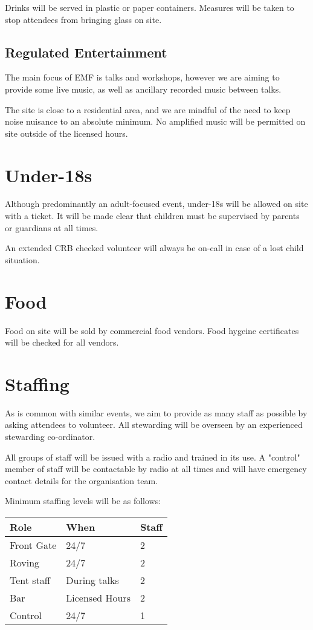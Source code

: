 Drinks will be served in plastic or paper containers. Measures will be taken to
stop attendees from bringing glass on site.

\subsection{Regulated Entertainment}

The main focus of EMF is talks and workshops, however we are aiming to provide some live music,
as well as ancillary recorded music between talks.

The site is close to a residential area, and we are mindful of the need to keep noise nuisance
to an absolute minimum. No amplified music will be permitted on site outside of the licensed hours.

\section{Under-18s}

Although predominantly an adult-focused event, under-18s will be allowed on site with a ticket. It will be
made clear that children must be supervised by parents or guardians at all times.

An extended CRB checked volunteer will always be on-call in case of a lost child situation.

\section{Food}

Food on site will be sold by commercial food vendors. Food hygeine certificates will be checked for all vendors.

\section{Staffing}

As is common with similar events, we aim to provide as many staff as possible
by asking attendees to volunteer. All stewarding will be overseen by an experienced stewarding co-ordinator.

All groups of staff will be issued with a radio and trained in its use. A "control" member of staff will be
contactable by radio at all times and will have emergency contact details for the organisation team.

Minimum staffing levels will be as follows:

\begin{tabular}{ l l l }
Role & When & Staff \\
\hline
Front Gate & 24/7 & 2 \\
Roving & 24/7 & 2 \\
Tent staff & During talks & 2 \\
Bar & Licensed Hours & 2 \\
Control & 24/7 & 1
\end{tabular}

